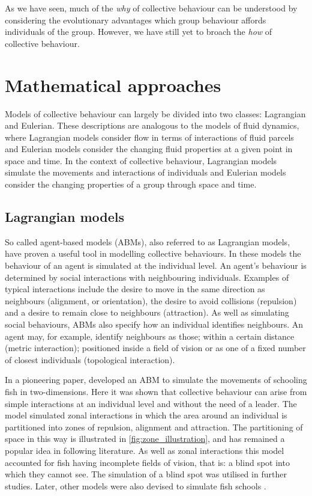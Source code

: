 As we have seen, much of the \emph{why} of collective behaviour can be understood by
considering the evolutionary advantages which group behaviour affords individuals of the
group. However, we have still yet to broach the \emph{how} of collective behaviour.

\section{Mathematical approaches}
\label{sec:models}

Models of collective behaviour can largely be divided into two classes: Lagrangian and
Eulerian.  These descriptions are analogous to the models of fluid dynamics, where
Lagrangian models consider flow in terms of interactions of fluid parcels and Eulerian
models consider the changing fluid properties at a given point in space and time. In the
context of collective behaviour, Lagrangian models simulate the movements and interactions
of individuals and Eulerian models consider the changing properties of a group through
space and time.

\subsection{Lagrangian models}
\label{ssec:lagrangian_models}

So called agent-based models (ABMs), also referred to as Lagrangian models, have proven a
useful tool in modelling collective behaviours. In these models the behaviour of an agent
is simulated at the individual level. An agent's behaviour is determined by social
interactions with neighbouring individuals. Examples of typical interactions include the
desire to move in the same direction as neighbours (alignment, or orientation), the desire
to avoid collisions (repulsion) and a desire to remain close to neighbours (attraction).
As well as simulating social behaviours, ABMs also specify how an individual identifies
neighbours. An agent may, for example, identify neighbours as those; within a certain
distance (metric interaction); positioned inside a field of vision or as one of a fixed
number of closest individuals (topological interaction).

In a pioneering paper, \textcite{aoki82} developed an ABM to simulate the movements of
schooling fish in two-dimensions. Here it was shown that collective behaviour can arise
from simple interactions at an individual level and without the need of a leader. The
model simulated zonal interactions in which the area around an individual is partitioned
into zones of repulsion, alignment and attraction. The partitioning of space in this way
is illustrated in \cref{fig:zone_illustration}, and has remained a popular idea in
following literature. As well as zonal interactions this model accounted for fish having
incomplete fields of vision, that is: a blind spot into which they cannot see. The
simulation of a blind spot was utilised in further studies. Later, other models were also
devised to simulate fish schools \parencite{okubo86, huth92}.

